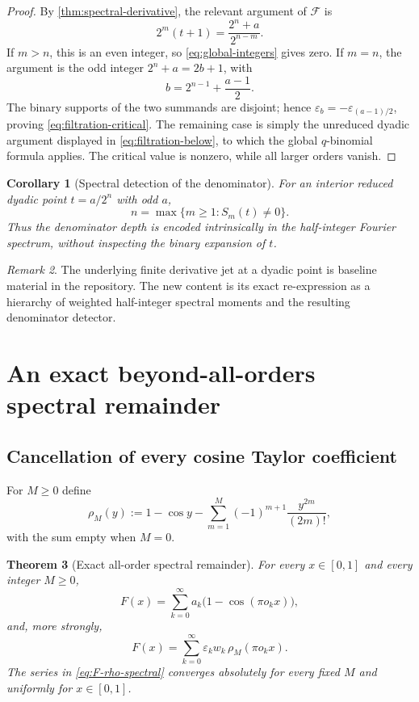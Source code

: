 \documentclass[11pt,oneside]{article}
\newtheorem{theorem}{Theorem}[section]
\newtheorem{corollary}[theorem]{Corollary}
\theoremstyle{definition}
\theoremstyle{remark}
\newtheorem{remark}[theorem]{Remark}
\newcommand{\eps}{\varepsilon}
\newcommand{\GF}{\mathcal F}
\begin{document}
\begin{proof}
By \cref{thm:spectral-derivative}, the relevant argument of $\GF$ is
\[
 2^m(t+1)=\frac{2^n+a}{2^{n-m}}.
\]
If $m>n$, this is an even integer, so \eqref{eq:global-integers} gives zero.
If $m=n$, the argument is the odd integer $2^n+a=2b+1$, with
\[
 b=2^{n-1}+\frac{a-1}{2}.
\]
The binary supports of the two summands are disjoint; hence
$\eps_b=-\eps_{(a-1)/2}$, proving \eqref{eq:filtration-critical}.  The remaining
case is simply the unreduced dyadic argument displayed in
\eqref{eq:filtration-below}, to which the global $q$-binomial formula applies.
The critical value is nonzero, while all larger orders vanish.
\end{proof}

\begin{corollary}[Spectral detection of the denominator]\label{cor:denominator-detection}
For an interior reduced dyadic point $t=a/2^n$ with odd $a$,
\begin{equation}\label{eq:denominator-detection}
 n=\max\{m\ge1:S_m(t)\ne0\}.
\end{equation}
Thus the denominator depth is encoded intrinsically in the half-integer
Fourier spectrum, without inspecting the binary expansion of $t$.
\end{corollary}

\begin{remark}
The underlying finite derivative jet at a dyadic point is baseline material in
the repository.  The new content is its exact re-expression as a hierarchy of
weighted half-integer spectral moments and the resulting denominator detector.
\end{remark}

\section{An exact beyond-all-orders spectral remainder}\label{sec:beyond-all-orders}

\subsection{Cancellation of every cosine Taylor coefficient}

For $M\ge0$ define
\begin{equation}\label{eq:rho-M}
 \rho_M(y):=1-\cos y-
 \sum_{m=1}^{M}(-1)^{m+1}\frac{y^{2m}}{(2m)!},
\end{equation}
with the sum empty when $M=0$.

\begin{theorem}[Exact all-order spectral remainder]\label{thm:spectral-remainder}
For every $x\in[0,1]$ and every integer $M\ge0$,
\begin{equation}\label{eq:F-basic-spectral}
 F(x)=\sum_{k=0}^{\infty}a_k
 \bigl(1-\cos(\pi o_kx)\bigr),
\end{equation}
and, more strongly,
\begin{equation}\label{eq:F-rho-spectral}
 \boxed{
 F(x)=\sum_{k=0}^{\infty}\eps_kw_k\,
 \rho_M(\pi o_kx).}
\end{equation}
The series in \eqref{eq:F-rho-spectral} converges absolutely for every fixed
$M$ and uniformly for $x\in[0,1]$.
\end{theorem}
\end{document}

